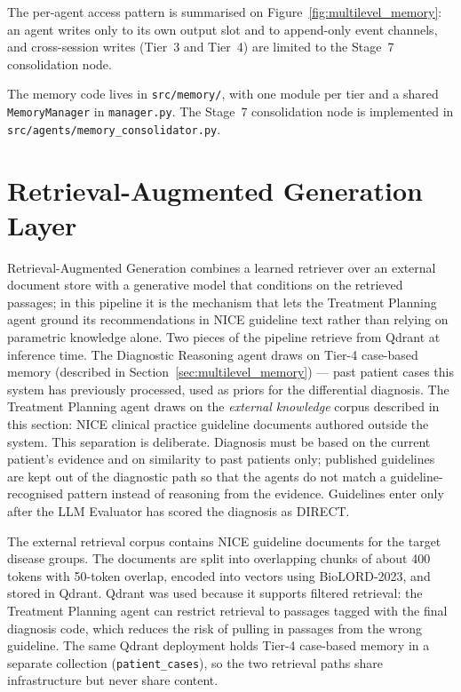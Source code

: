 The per-agent access pattern is summarised on
Figure~\ref{fig:multilevel_memory}: an agent writes only to its own
output slot and to append-only event channels, and cross-session
writes (Tier~3 and Tier~4) are limited to the Stage~7 consolidation
node.

The memory code lives in \texttt{src/memory/}, with one module per tier and a
shared \texttt{MemoryManager} in \texttt{manager.py}. The Stage~7 consolidation
node is implemented in \texttt{src/agents/memory\_consolidator.py}.

\FloatBarrier
\section{Retrieval-Augmented Generation Layer}
\label{sec:rag}

Retrieval-Augmented Generation \cite{Lewis2020RAG} combines a learned
retriever over an external document store with a generative model
that conditions on the retrieved passages; in this pipeline it is the
mechanism that lets the Treatment Planning agent ground its
recommendations in NICE guideline text rather than relying on
parametric knowledge alone. Two pieces of the pipeline retrieve from
Qdrant at inference time. The
Diagnostic Reasoning agent draws on Tier-4 case-based memory (described
in Section~\ref{sec:multilevel_memory}) --- past patient cases this
system has previously processed, used as priors for the differential
diagnosis. The Treatment Planning agent draws on the
\emph{external knowledge} corpus described in this section: NICE
clinical practice guideline documents \cite{NICEGuidelines}
authored outside the system.
This separation is deliberate. Diagnosis must be based on the current
patient's evidence and on similarity to past patients only; published
guidelines are kept out of the diagnostic path so that the agents do
not match a guideline-recognised pattern instead of reasoning from the
evidence. Guidelines enter only after the LLM Evaluator has scored
the diagnosis as DIRECT.

The external retrieval corpus contains NICE guideline documents for
the target disease groups. The documents are split into overlapping
chunks of about 400 tokens with 50-token overlap, encoded into
vectors using BioLORD-2023, and stored in Qdrant. Qdrant was used because it
supports filtered retrieval: the Treatment Planning agent can
restrict retrieval to passages tagged with the final diagnosis code,
which reduces the risk of pulling in passages from the wrong
guideline. The same Qdrant deployment holds Tier-4 case-based memory
in a separate collection (\texttt{patient\_cases}), so the two
retrieval paths share infrastructure but never share content.

